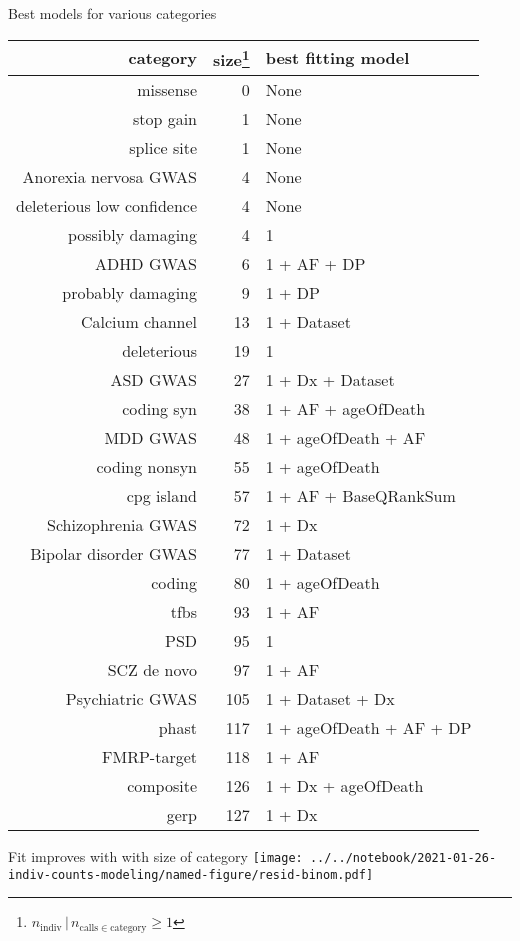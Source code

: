 \documentclass[usenames,dvipsnames]{beamer}
\begin{document}
\begin{frame}{Best models for various categories}
\begin{center}
\tiny
\begin{tabular}{rrl}
\hline
category  & size\footnote{\(n_\mathrm{indiv} \,|\, n_{\mathrm{calls} \in
			\mathrm{category}} \ge 1\)} & best fitting model  \\
\hline
missense & 0 & None \\
stop gain & 1 & None \\
splice site & 1 & None \\
Anorexia nervosa GWAS & 4 & None \\
deleterious low confidence & 4 & None \\
possibly damaging & 4 & 1 \\
ADHD GWAS & 6 & 1 + AF + DP \\
probably damaging & 9 & 1 + DP \\
Calcium channel & 13 & 1 + Dataset \\
deleterious & 19 & 1 \\
ASD GWAS & 27 & 1 + Dx + Dataset \\
coding syn & 38 & 1 + AF + ageOfDeath \\
MDD GWAS & 48 & 1 + ageOfDeath + AF \\
coding nonsyn & 55 & 1 + ageOfDeath \\
cpg island & 57 & 1 + AF + BaseQRankSum \\
Schizophrenia GWAS & 72 & 1 + Dx \\
Bipolar disorder GWAS & 77 & 1 + Dataset \\
coding & 80 & 1 + ageOfDeath \\
tfbs & 93 & 1 + AF \\
PSD & 95 & 1 \\
SCZ de novo & 97 & 1 + AF \\
Psychiatric GWAS & 105 & 1 + Dataset + Dx \\
phast & 117 & 1 + ageOfDeath + AF + DP \\
FMRP-target & 118 & 1 + AF \\
composite & 126 & 1 + Dx + ageOfDeath \\
gerp & 127 & 1 + Dx \\
\end{tabular}
\end{center}
\end{frame}

\begin{frame}{Fit improves with with size of category}
\texttt{[image: ../../notebook/2021-01-26-indiv-counts-modeling/named-figure/resid-binom.pdf]}
\end{frame}
\end{document}
